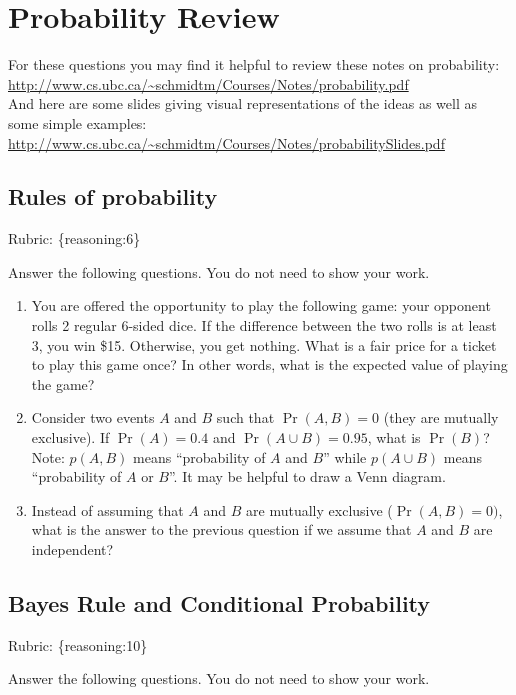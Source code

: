 \documentclass{article}
\def\rubric#1{\gre{Rubric: \{#1\}}}{}
\def\blu#1{{\color{blu}#1}}
\def\gre#1{{\color{gre}#1}}
\begin{document}
\section{Probability Review}


For these questions you may find it helpful to review these notes on probability:\\
\url{http://www.cs.ubc.ca/~schmidtm/Courses/Notes/probability.pdf}\\
And here are some slides giving visual representations of the ideas as well as some simple examples:\\
\url{http://www.cs.ubc.ca/~schmidtm/Courses/Notes/probabilitySlides.pdf}

\subsection{Rules of probability}
\rubric{reasoning:6}

\blu{Answer the following questions.} You do not need to show your work.


\begin{enumerate}
\item You are offered the opportunity to play the following game: your opponent rolls 2 regular 6-sided dice. If the difference between the two rolls is at least 3, you win \$15. Otherwise, you get nothing. What is a fair price for a ticket to play this game once? In other words, what is the expected value of playing the game?
\item Consider two events $A$ and $B$ such that $\Pr(A, B)=0$ (they are mutually exclusive). If $\Pr(A) = 0.4$ and $\Pr(A \cup B) = 0.95$, what is $\Pr(B)$? Note: $p(A, B)$ means
``probability of $A$ and $B$'' while $p(A \cup B)$ means ``probability of $A$ or $B$''. It may be helpful to draw a Venn diagram.
\item Instead of assuming that $A$ and $B$ are mutually exclusive ($\Pr(A,B) = 0)$, what is the answer to the previous question if we assume that $A$ and $B$ are independent?

\end{enumerate}

\subsection{Bayes Rule and Conditional Probability}
\rubric{reasoning:10}

\blu{Answer the following questions.} You do not need to show your work.
\end{document}
